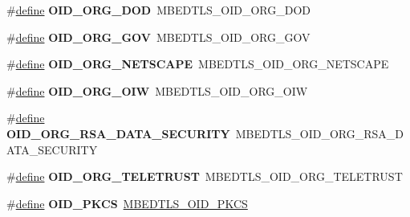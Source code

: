 \begin{DoxyCompactItemize}
\item 
\mbox{\label{compat-1_83_8h_a1c0faa65431b3790d1248edb74ac0489}} 
\#\hyperlink{structdefine}{define} {\bfseries O\+I\+D\+\_\+\+O\+R\+G\+\_\+\+D\+OD}~M\+B\+E\+D\+T\+L\+S\+\_\+\+O\+I\+D\+\_\+\+O\+R\+G\+\_\+\+D\+OD
\item 
\mbox{\label{compat-1_83_8h_ad91e74eb131ed59d428f1b2c7f7dd7f8}} 
\#\hyperlink{structdefine}{define} {\bfseries O\+I\+D\+\_\+\+O\+R\+G\+\_\+\+G\+OV}~M\+B\+E\+D\+T\+L\+S\+\_\+\+O\+I\+D\+\_\+\+O\+R\+G\+\_\+\+G\+OV
\item 
\mbox{\label{compat-1_83_8h_ab22c0f0fe09851fc6e510ce9a989d2f5}} 
\#\hyperlink{structdefine}{define} {\bfseries O\+I\+D\+\_\+\+O\+R\+G\+\_\+\+N\+E\+T\+S\+C\+A\+PE}~M\+B\+E\+D\+T\+L\+S\+\_\+\+O\+I\+D\+\_\+\+O\+R\+G\+\_\+\+N\+E\+T\+S\+C\+A\+PE
\item 
\mbox{\label{compat-1_83_8h_a6ac5548c91277435950a0ec3a7bef39e}} 
\#\hyperlink{structdefine}{define} {\bfseries O\+I\+D\+\_\+\+O\+R\+G\+\_\+\+O\+IW}~M\+B\+E\+D\+T\+L\+S\+\_\+\+O\+I\+D\+\_\+\+O\+R\+G\+\_\+\+O\+IW
\item 
\mbox{\label{compat-1_83_8h_ab6e4b7ca69e303951bfe5216ed2a044a}} 
\#\hyperlink{structdefine}{define} {\bfseries O\+I\+D\+\_\+\+O\+R\+G\+\_\+\+R\+S\+A\+\_\+\+D\+A\+T\+A\+\_\+\+S\+E\+C\+U\+R\+I\+TY}~M\+B\+E\+D\+T\+L\+S\+\_\+\+O\+I\+D\+\_\+\+O\+R\+G\+\_\+\+R\+S\+A\+\_\+\+D\+A\+T\+A\+\_\+\+S\+E\+C\+U\+R\+I\+TY
\item 
\mbox{\label{compat-1_83_8h_a55494632e5df77e11032d1f135b73008}} 
\#\hyperlink{structdefine}{define} {\bfseries O\+I\+D\+\_\+\+O\+R\+G\+\_\+\+T\+E\+L\+E\+T\+R\+U\+ST}~M\+B\+E\+D\+T\+L\+S\+\_\+\+O\+I\+D\+\_\+\+O\+R\+G\+\_\+\+T\+E\+L\+E\+T\+R\+U\+ST
\item 
\mbox{\label{compat-1_83_8h_a4eb6163dc6483ad673611f62361f1b96}} 
\#\hyperlink{structdefine}{define} {\bfseries O\+I\+D\+\_\+\+P\+K\+CS}~\hyperlink{oid_8h_af14ca6f25be2df68aefb743374bc67c1}{M\+B\+E\+D\+T\+L\+S\+\_\+\+O\+I\+D\+\_\+\+P\+K\+CS}
\item 
\mbox{\label{compat-1_83_8h_affd3c6c6b6029897c09631c9e71b5775}} 

\end{DoxyCompactItemize}
